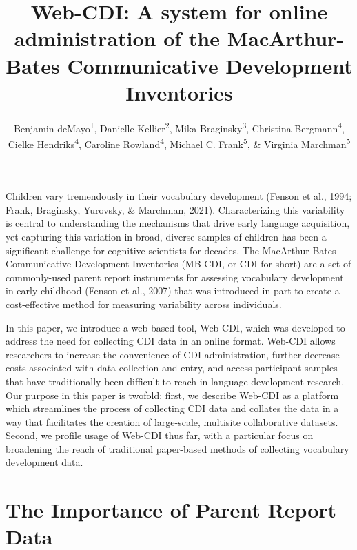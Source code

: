 \documentclass[
  english,
  ,man,floatsintext]{apa6}
\title{Web-CDI: A system for online administration of the MacArthur-Bates Communicative Development Inventories}
\author{Benjamin deMayo\textsuperscript{1}, Danielle Kellier\textsuperscript{2}, Mika Braginsky\textsuperscript{3}, Christina Bergmann\textsuperscript{4}, Cielke Hendriks\textsuperscript{4}, Caroline Rowland\textsuperscript{4}, Michael C. Frank\textsuperscript{5}, \& Virginia Marchman\textsuperscript{5}}
\date{}
\affiliation{\vspace{0.5cm}\textsuperscript{1} Princeton University\\\textsuperscript{2} University of Pennsylvania\\\textsuperscript{3} Massachussetts Institute of Technology\\\textsuperscript{4} Max Planck Institute for Psycholinguistics\\\textsuperscript{5} Stanford University}
\begin{document}
\maketitle

Children vary tremendously in their vocabulary development (Fenson et al., 1994; Frank, Braginsky, Yurovsky, \& Marchman, 2021). Characterizing this variability is central to understanding the mechanisms that drive early language acquisition, yet capturing this variation in broad, diverse samples of children has been a significant challenge for cognitive scientists for decades. The MacArthur-Bates Communicative Development Inventories (MB-CDI, or CDI for short) are a set of commonly-used parent report instruments for assessing vocabulary development in early childhood (Fenson et al., 2007) that was introduced in part to create a cost-effective method for measuring variability across individuals.

In this paper, we introduce a web-based tool, Web-CDI, which was developed to address the need for collecting CDI data in an online format. Web-CDI allows researchers to increase the convenience of CDI administration, further decrease costs associated with data collection and entry, and access participant samples that have traditionally been difficult to reach in language development research. Our purpose in this paper is twofold: first, we describe Web-CDI as a platform which streamlines the process of collecting CDI data and collates the data in a way that facilitates the creation of large-scale, multisite collaborative datasets. Second, we profile usage of Web-CDI thus far, with a particular focus on broadening the reach of traditional paper-based methods of collecting vocabulary development data.

\hypertarget{the-importance-of-parent-report-data}{%
\section{The Importance of Parent Report Data}\label{the-importance-of-parent-report-data}}
\end{document}
